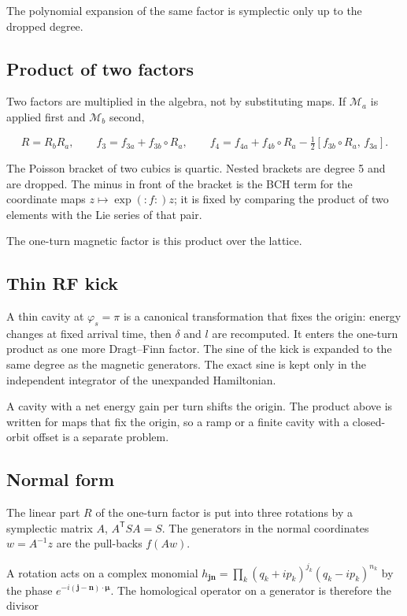 \documentclass[11pt,a4paper]{article}
\begin{document}
The polynomial expansion of the same factor is symplectic only up to the
dropped degree.

\subsection{Product of two factors}

Two factors are multiplied in the algebra, not by substituting maps. If
$\mathcal{M}_a$ is applied first and $\mathcal{M}_b$ second,

\[
R=R_b R_a,\qquad
f_3=f_{3a}+f_{3b}\circ R_a,\qquad
f_4=f_{4a}+f_{4b}\circ R_a-\tfrac12[f_{3b}\circ R_a,\,f_{3a}].
\]

The Poisson bracket of two cubics is quartic. Nested brackets are degree 5
and are dropped. The minus in front of the bracket is the BCH term for the
coordinate maps $z\mapsto\exp(:f:)z$; it is fixed by comparing the product
of two elements with the Lie series of that pair.

The one-turn magnetic factor is this product over the lattice.

\subsection{Thin RF kick}

A thin cavity at $\varphi_s=\pi$ is a canonical transformation that fixes
the origin: energy changes at fixed arrival time, then $\delta$ and $l$
are recomputed. It enters the one-turn product as one more Dragt–Finn
factor. The sine of the kick is expanded to the same degree as the magnetic
generators. The exact sine is kept only in the independent integrator of the
unexpanded Hamiltonian.

A cavity with a net energy gain per turn shifts the origin. The product
above is written for maps that fix the origin, so a ramp or a finite cavity
with a closed-orbit offset is a separate problem.

\subsection{Normal form}

The linear part $R$ of the one-turn factor is put into three rotations by
a symplectic matrix $A$, $A^\mathsf{T}SA=S$. The generators in the
normal coordinates $w=A^{-1}z$ are the pull-backs $f(Aw)$.

A rotation acts on a complex monomial
$h_{\mathbf{j}\mathbf{n}}=\prod_k(q_k+ip_k)^{j_k}(q_k-ip_k)^{n_k}$ by the
phase $e^{-i(\mathbf{j}-\mathbf{n})\cdot\boldsymbol{\mu}}$. The homological
operator on a generator is therefore the divisor
\end{document}
